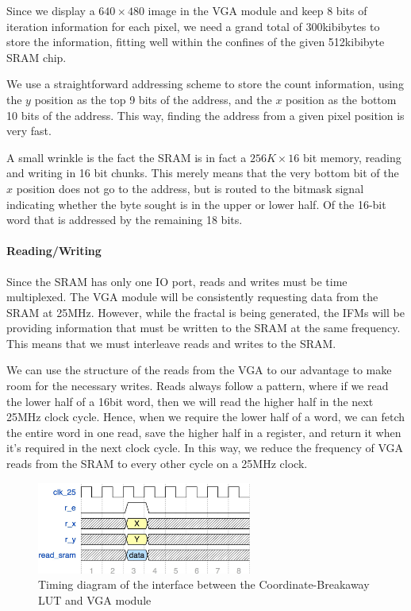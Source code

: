 \documentclass{article}
\begin{document}
Since we display a $640\times 480$ image in the VGA module and keep 8
bits of iteration information for each pixel, we need a grand total of
300kibibytes to store the information, fitting well within the
confines of the given 512kibibyte SRAM chip.

We use a straightforward addressing scheme to store the count
information, using the $y$ position as the top 9 bits of the address,
and the $x$ position as the bottom 10 bits of the address. This way,
finding the address from a given pixel position is very fast.

A small wrinkle is the fact the SRAM is in fact a $256K\times 16$ bit memory,
reading and writing in 16 bit chunks. This merely means that the very
bottom bit of the $x$ position does not go to the address, but is
routed to the bitmask signal indicating whether the byte sought is in the upper or lower half.
Of the 16-bit word that is addressed by the remaining 18 bits.

\paragraph{Reading/Writing}

Since the SRAM has only one IO port, reads and writes must be time
multiplexed. The VGA module will be consistently requesting data from the SRAM at 25MHz. However, while 
the fractal is being generated, the IFMs will be providing information that must be written to the SRAM 
at the same frequency. This means that we must interleave reads and writes to the SRAM.

We can use the structure of the reads from the VGA to our
advantage to make room for the necessary writes. Reads always follow a pattern, where
if we read the lower half of a 16bit word, then we will read the
higher half in the next 25MHz clock cycle. Hence, when we require the lower
half of a word, we can fetch the entire word in one read, save the
higher half in a register, and return it when it's required in
the next clock cycle. In this way, we reduce the frequency of VGA reads from the SRAM to every other cycle on a 
25MHz clock.

\begin{figure}[H]
  \centering
    \includegraphics[width=200pt]{timing_diagrams/clut_vga.pdf}
  \caption{Timing diagram of the interface between the Coordinate-Breakaway LUT and VGA module}
\end{figure}
\end{document}
